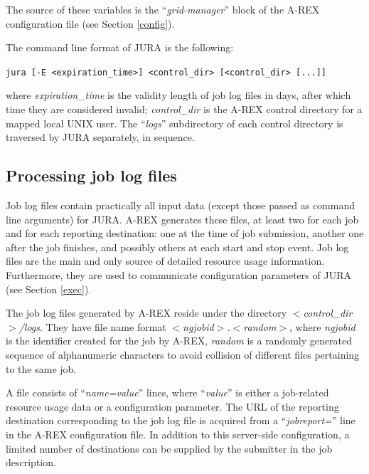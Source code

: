 \documentclass{article}                            %
\begin{document}
The source of these variables is the ``\textit{grid-manager}'' block
of the A-REX configuration file (see Section \ref{config}).

The command line format of JURA is the following: %

\verb|jura [-E <expiration_time>] <control_dir> [<control_dir> [...]]|

where \textit{expiration\_time} is the validity length of job log
files in days, after which time they are considered invalid;
\textit{control\_dir} is the A-REX control directory for a mapped
local UNIX user. The ``\textit{logs}'' subdirectory of each control
directory is traversed by JURA separately, in sequence.

\subsection{Processing job log files}
\label{joblogs}

Job log files contain practically all input data (except those passed
as command line arguments) for JURA. A-REX generates these files, at
least two for each job and for each reporting destination: one at the
time of job submission, another one after the job finishes, and
possibly others at each start and stop event. Job log files are the
main and only source of detailed resource usage information.
Furthermore, they are used to communicate configuration parameters of
JURA (see Section \ref{exec}).

The job log files generated by A-REX reside under the directory
\textit{$<$control\_dir$>$/logs}\cite{arex}. They have file name format
\textit{$<$ngjobid$>$.$<$random$>$}, where \textit{ngjobid} is the
identifier created for the job by A-REX, \textit{random} is a randomly
generated sequence of alphanumeric characters to avoid collision of
different files pertaining to the same job. 

A file consists of ``\textit{name=value}'' lines, where
``\textit{value}'' is either a job-related resource usage data or a
configuration parameter. The URL of the reporting destination
corresponding to the job log file is acquired from a
``\textit{jobreport=}'' line in the A-REX configuration file. In
addition to this server-side configuration, a limited number of
destinations can be supplied by the submitter in the job
description.

\end{document}
